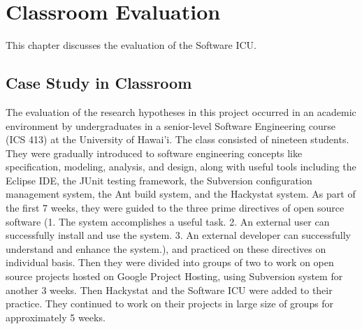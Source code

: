 

\chapter{Classroom Evaluation}
This chapter discusses the evaluation of the Software ICU. 

\section{Case Study in Classroom}
The evaluation of the research hypotheses in this project occurred in an academic environment by undergraduates in a senior-level Software Engineering course (ICS 413) at the University of Hawai’i. The class consisted of nineteen students. They were gradually introduced to software engineering concepts like specification, modeling, analysis, and design, along with useful tools including the Eclipse IDE, the JUnit testing framework, the Subversion configuration management system, the Ant build system, and the Hackystat system. As part of the first 7 weeks, they were guided to the three prime directives of open source software (1. The system accomplishes a useful task. 2. An external user can successfully install and use the system. 3. An external developer can successfully understand and enhance the system.), and practiced on these directives on individual basis. Then they were divided into groups of two to work on open source projects hosted on Google Project Hosting, using Subversion system for another 3 weeks. Then Hackystat and the Software ICU were added to their practice. They continued to work on their projects in large size of groups for approximately 5 weeks.

